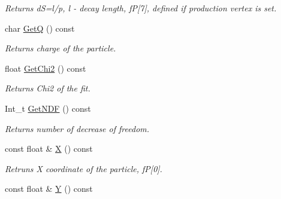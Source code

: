 \begin{DoxyCompactItemize}
\begin{DoxyCompactList}\small\item\em Returns dS=l/p, l -\/ decay length, fP\mbox{[}7\mbox{]}, defined if production vertex is set. \end{DoxyCompactList}\item 
char \hyperlink{classKFParticleBase_a97b4d2ef119c13e0117b0367473cb153}{GetQ} () const \hypertarget{classKFParticleBase_a97b4d2ef119c13e0117b0367473cb153}{}\label{classKFParticleBase_a97b4d2ef119c13e0117b0367473cb153}

\begin{DoxyCompactList}\small\item\em Returns charge of the particle. \end{DoxyCompactList}\item 
float \hyperlink{classKFParticleBase_aef4f146c36bffafe0ac1fa9a5d48ada2}{Get\+Chi2} () const \hypertarget{classKFParticleBase_aef4f146c36bffafe0ac1fa9a5d48ada2}{}\label{classKFParticleBase_aef4f146c36bffafe0ac1fa9a5d48ada2}

\begin{DoxyCompactList}\small\item\em Returns Chi2 of the fit. \end{DoxyCompactList}\item 
Int\+\_\+t \hyperlink{classKFParticleBase_a128dbedb73783a25e76a9115ec0af9ac}{Get\+N\+DF} () const \hypertarget{classKFParticleBase_a128dbedb73783a25e76a9115ec0af9ac}{}\label{classKFParticleBase_a128dbedb73783a25e76a9115ec0af9ac}

\begin{DoxyCompactList}\small\item\em Returns number of decrease of freedom. \end{DoxyCompactList}\item 
const float \& \hyperlink{classKFParticleBase_af624ef17e57f675476a2a0e597ce2983}{X} () const \hypertarget{classKFParticleBase_af624ef17e57f675476a2a0e597ce2983}{}\label{classKFParticleBase_af624ef17e57f675476a2a0e597ce2983}

\begin{DoxyCompactList}\small\item\em Retruns X coordinate of the particle, fP\mbox{[}0\mbox{]}. \end{DoxyCompactList}\item 
const float \& \hyperlink{classKFParticleBase_ad7d7e1a209955c43efac37d6136ac406}{Y} () const \hypertarget{classKFParticleBase_ad7d7e1a209955c43efac37d6136ac406}{}\label{classKFParticleBase_ad7d7e1a209955c43efac37d6136ac406}


\end{DoxyCompactItemize}
